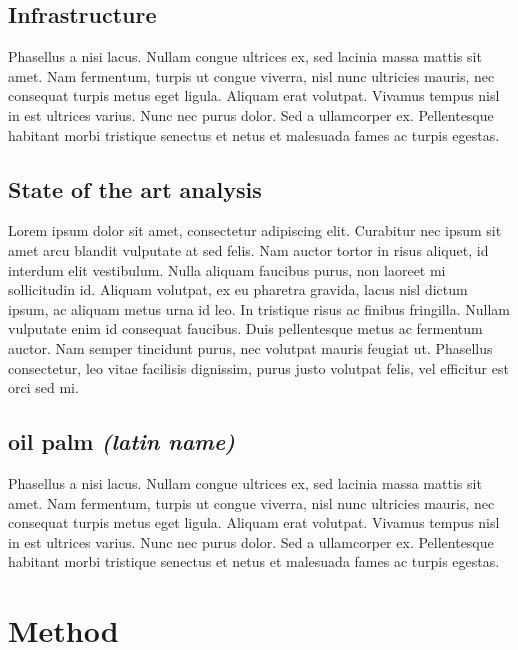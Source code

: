 \documentclass[
  letterpaper,
  DIV=11,
  numbers=noendperiod]{scrreprt}
\begin{document}
\hypertarget{infrastructure}{%
\section{Infrastructure}\label{infrastructure}}

Phasellus a nisi lacus. Nullam congue ultrices ex, sed lacinia massa
mattis sit amet. Nam fermentum, turpis ut congue viverra, nisl nunc
ultricies mauris, nec consequat turpis metus eget ligula. Aliquam erat
volutpat. Vivamus tempus nisl in est ultrices varius. Nunc nec purus
dolor. Sed a ullamcorper ex. Pellentesque habitant morbi tristique
senectus et netus et malesuada fames ac turpis egestas.

\hypertarget{state-of-the-art-analysis}{%
\section{State of the art analysis}\label{state-of-the-art-analysis}}

Lorem ipsum dolor sit amet, consectetur adipiscing elit. Curabitur nec
ipsum sit amet arcu blandit vulputate at sed felis. Nam auctor tortor in
risus aliquet, id interdum elit vestibulum. Nulla aliquam faucibus
purus, non laoreet mi sollicitudin id. Aliquam volutpat, ex eu pharetra
gravida, lacus nisl dictum ipsum, ac aliquam metus urna id leo. In
tristique risus ac finibus fringilla. Nullam vulputate enim id consequat
faucibus. Duis pellentesque metus ac fermentum auctor. Nam semper
tincidunt purus, nec volutpat mauris feugiat ut. Phasellus consectetur,
leo vitae facilisis dignissim, purus justo volutpat felis, vel efficitur
est orci sed mi.

\hypertarget{oil-palm-latin-name}{%
\section{\texorpdfstring{oil palm \emph{(latin
name)}}{oil palm (latin name)}}\label{oil-palm-latin-name}}

Phasellus a nisi lacus. Nullam congue ultrices ex, sed lacinia massa
mattis sit amet. Nam fermentum, turpis ut congue viverra, nisl nunc
ultricies mauris, nec consequat turpis metus eget ligula. Aliquam erat
volutpat. Vivamus tempus nisl in est ultrices varius. Nunc nec purus
dolor. Sed a ullamcorper ex. Pellentesque habitant morbi tristique
senectus et netus et malesuada fames ac turpis egestas.


\hypertarget{method}{%
\chapter{Method}\label{method}}
\end{document}
